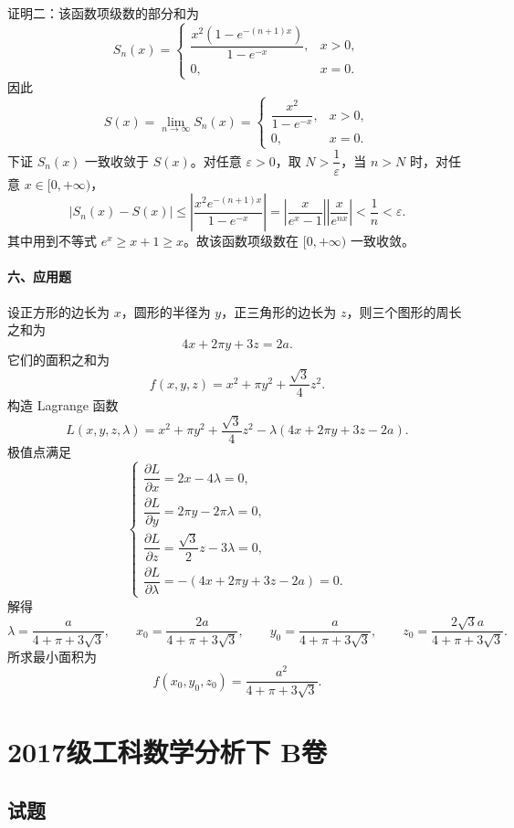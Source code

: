 证明二：该函数项级数的部分和为
\[
  S_n(x)=
  \begin{cases}
    \dfrac{x^2(1-e^{-(n+1)x})}{1-e^{-x}}, & x>0,\\
    0, & x=0.
  \end{cases}
\]
因此
\[
  S(x)=\lim_{n\to\infty}S_n(x)=
  \begin{cases}
    \dfrac{x^2}{1-e^{-x}}, & x>0,\\
    0, & x=0.
  \end{cases}
\]
下证 $S_n(x)$ 一致收敛于 $S(x)$。对任意 $\varepsilon>0$，取 $N>\dfrac1\varepsilon$，当 $n>N$ 时，对任意 $x\in[0,+\infty)$，
\[
  |S_n(x)-S(x)|
  \le \left|\frac{x^2e^{-(n+1)x}}{1-e^{-x}}\right|
  =\left|\frac{x}{e^x-1}\right|\left|\frac{x}{e^{nx}}\right|
  <\frac1n<\varepsilon.
\]
其中用到不等式 $e^x\ge x+1\ge x$。故该函数项级数在 $[0,+\infty)$ 一致收敛。

\paragraph*{六、应用题}
设正方形的边长为 $x$，圆形的半径为 $y$，正三角形的边长为 $z$，则三个图形的周长之和为
\[
  4x+2\pi y+3z=2a.
\]
它们的面积之和为
\[
  f(x,y,z)=x^2+\pi y^2+\frac{\sqrt3}{4}z^2.
\]
构造 Lagrange 函数
\[
  L(x,y,z,\lambda)
  =x^2+\pi y^2+\frac{\sqrt3}{4}z^2
  -\lambda(4x+2\pi y+3z-2a).
\]
极值点满足
\[
  \begin{cases}
    \dfrac{\partial L}{\partial x}=2x-4\lambda=0,\\
    \dfrac{\partial L}{\partial y}=2\pi y-2\pi\lambda=0,\\
    \dfrac{\partial L}{\partial z}=\dfrac{\sqrt3}{2}z-3\lambda=0,\\
    \dfrac{\partial L}{\partial \lambda}=-(4x+2\pi y+3z-2a)=0.
  \end{cases}
  \]
  解得
  \[
    \lambda=\frac{a}{4+\pi+3\sqrt3},\qquad
    x_0=\frac{2a}{4+\pi+3\sqrt3},\qquad
    y_0=\frac{a}{4+\pi+3\sqrt3},\qquad
    z_0=\frac{2\sqrt3a}{4+\pi+3\sqrt3}.
  \]
  所求最小面积为
  \[
    f(x_0,y_0,z_0)=\frac{a^2}{4+\pi+3\sqrt3}.
  \]

\section{2017级工科数学分析下 B卷}

\subsection{试题}

